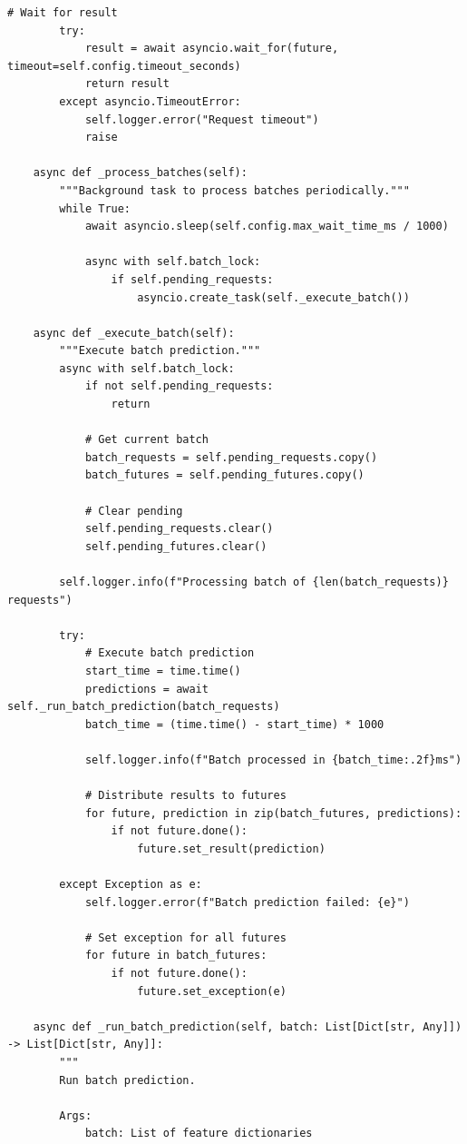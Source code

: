 \begin{lstlisting}[style=python, caption={Dynamic Request Batching}]
        # Wait for result
        try:
            result = await asyncio.wait_for(future, timeout=self.config.timeout_seconds)
            return result
        except asyncio.TimeoutError:
            self.logger.error("Request timeout")
            raise

    async def _process_batches(self):
        """Background task to process batches periodically."""
        while True:
            await asyncio.sleep(self.config.max_wait_time_ms / 1000)

            async with self.batch_lock:
                if self.pending_requests:
                    asyncio.create_task(self._execute_batch())

    async def _execute_batch(self):
        """Execute batch prediction."""
        async with self.batch_lock:
            if not self.pending_requests:
                return

            # Get current batch
            batch_requests = self.pending_requests.copy()
            batch_futures = self.pending_futures.copy()

            # Clear pending
            self.pending_requests.clear()
            self.pending_futures.clear()

        self.logger.info(f"Processing batch of {len(batch_requests)} requests")

        try:
            # Execute batch prediction
            start_time = time.time()
            predictions = await self._run_batch_prediction(batch_requests)
            batch_time = (time.time() - start_time) * 1000

            self.logger.info(f"Batch processed in {batch_time:.2f}ms")

            # Distribute results to futures
            for future, prediction in zip(batch_futures, predictions):
                if not future.done():
                    future.set_result(prediction)

        except Exception as e:
            self.logger.error(f"Batch prediction failed: {e}")

            # Set exception for all futures
            for future in batch_futures:
                if not future.done():
                    future.set_exception(e)

    async def _run_batch_prediction(self, batch: List[Dict[str, Any]]) -> List[Dict[str, Any]]:
        """
        Run batch prediction.

        Args:
            batch: List of feature dictionaries


\end{lstlisting}
